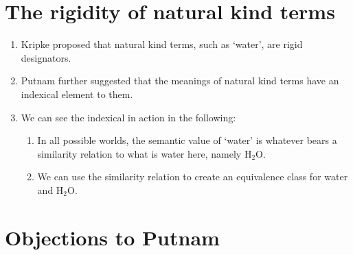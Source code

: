 \section{The rigidity of natural kind terms}

\begin{enumerate}[label=(\alph*)]
  \item Kripke proposed that natural kind terms, such as `water', are rigid designators.
  \item Putnam further suggested that the meanings of natural kind terms have an indexical element to them.
  \item We can see the indexical in action in the following:
  \begin{enumerate}[label=\roman*.]
    \item In all possible worlds, the semantic value of `water' is whatever bears a similarity relation to what is water here, namely H$_2$O.
    \item We can use the similarity relation to create an equivalence class for water and H$_2$O.
  \end{enumerate}
\end{enumerate}

\section{Objections to Putnam}

